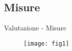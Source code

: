 \subsection{Misure}
\begin{frame}{Valutazione - Misure}
	\begin{figure}
	\texttt{[image: fig1]}
	\end{figure}
	
\end{frame}